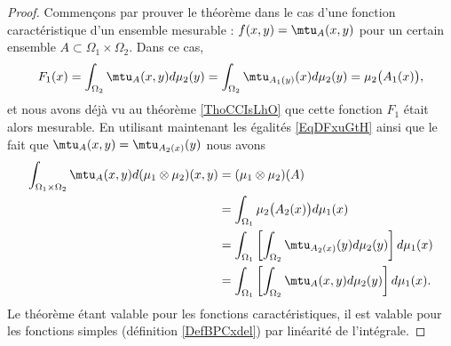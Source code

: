 \begin{proof}
    Commençons par prouver le théorème dans le cas d'une fonction caractéristique d'un ensemble mesurable : \( f(x,y)=\mtu_{A}(x,y)\) pour un certain ensemble \( A\subset \Omega_1\times \Omega_2\). Dans ce cas,
    \begin{equation}
        F_1(x)=\int_{\Omega_2}\mtu_A(x,y)d\mu_2(y)=\int_{\Omega_2}\mtu_{A_1(y)}(x)d\mu_2(y)=\mu_2\big( A_1(x) \big),
    \end{equation}
    et nous avons déjà vu au théorème \ref{ThoCCIsLhO} que cette fonction \( F_1\) était alors mesurable. En utilisant maintenant les égalités \eqref{EqDFxuGtH} ainsi que le fait que \( \mtu_A(x,y)=\mtu_{A_2(x)}(y)\) nous avons
    \begin{subequations}
        \begin{align}
            \int_{\Omega_1\times \Omega_2}\mtu_A(x,y)d(\mu_1\otimes \mu_2)(x,y)&=(\mu_1\otimes \mu_2)(A)\\
            &=\int_{\Omega_1}\mu_2\big( A_2(x) \big)d\mu_1(x)\\
            &=\int_{\Omega_1}\left[   \int_{\Omega_2}\mtu_{A_2(x)}(y)d\mu_2(y)  \right]d\mu_1(x)\\
            &=\int_{\Omega_1}\left[ \int_{\Omega_2}\mtu_A(x,y)d\mu_2(y) \right]d\mu_1(x).
        \end{align}
    \end{subequations}
    Le théorème étant valable pour les fonctions caractéristiques, il est valable pour les fonctions simples (définition \ref{DefBPCxdel}) par linéarité de l'intégrale.


\end{proof}
